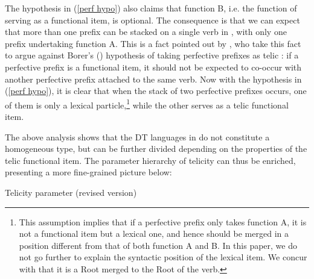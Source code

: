 \documentclass[output=paper]{langsci/langscibook}
\begin{document}
The hypothesis in (\ref{perf hypo}) also claims that function B, i.e. the
function of serving as a functional item, is optional. The consequence is that
we can expect that more than one prefix can be stacked on a single verb in
, with only one prefix undertaking function A. This is a fact
pointed out by \textcite{filiprothstein2005}, who take this fact to argue
against Borer's (\citeyear{Borer2005b}) hypothesis of taking perfective
prefixes as telic : if a perfective prefix is a
functional item, it should not be expected to co-occur with another perfective
prefix attached to the same verb. Now with the hypothesis in (\ref{perf hypo}),
it is clear that when the stack of two perfective prefixes occurs, one of them
is only a lexical particle,\footnote{This assumption implies that if a
perfective prefix only takes function A, it is not a functional item but a
lexical one, and hence should be merged in a position different from that of
both function A and B. In this paper, we do not go further to explain the
syntactic position of the lexical item. We concur with
\textcite{basilico2008syntactic} that it is a Root merged to the Root of the
verb.} while the other serves as a telic functional item.

The above analysis shows that the DT languages in  do not constitute a
homogeneous type, but can be further divided depending on the properties of the
telic functional item. The parameter hierarchy of
telicity can thus be enriched, presenting a more fine-grained picture
below:

\begin{exe}
\ex Telicity parameter (revised version)\smallskip\\
\end{exe}
\end{document}
